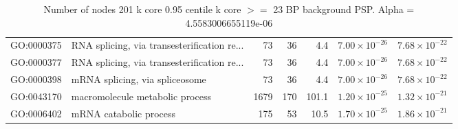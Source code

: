 \begin{table}[ht]
\begin{adjustbox}{width=\textwidth}
\begin{tabular}{llrrrrr}
  GO:0000375 & RNA splicing, via transesterification re... & 73 & 36 & 4.4 & $7.00 \times 10^{-26}$ & $7.68 \times 10^{-22}$ \\ 
  GO:0000377 & RNA splicing, via transesterification re... & 73 & 36 & 4.4 & $7.00 \times 10^{-26}$ & $7.68 \times 10^{-22}$ \\ 
  GO:0000398 & mRNA splicing, via spliceosome & 73 & 36 & 4.4 & $7.00 \times 10^{-26}$ & $7.68 \times 10^{-22}$ \\ 
  GO:0043170 & macromolecule metabolic process & 1679 & 170 & 101.1 & $1.20 \times 10^{-25}$ & $1.32 \times 10^{-21}$ \\ 
  GO:0006402 & mRNA catabolic process & 175 & 53 & 10.5 & $1.70 \times 10^{-25}$ & $1.86 \times 10^{-21}$ \\ 
   \hline
\end{tabular}
\end{adjustbox}
\caption{Number of nodes 201 k core 0.95 centile  k core $>=$ 23 BP background PSP. Alpha = 4.5583006655119e-06} 
\label{tab:Number of nodes 201 k core 0.95 centile  k core $>=$ 23 BP background PSP. Alpha = 4.5583006655119e-06}
\end{table}

